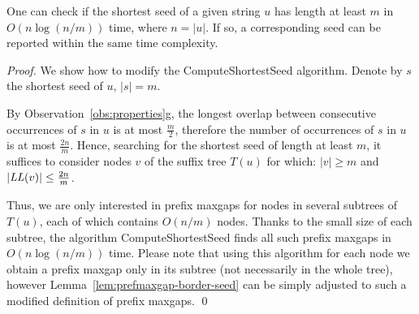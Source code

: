 \documentclass{llncs}
\newcommand{\Tree}{T}
\newcommand{\LL}{\mbox{\textit{LL}}}
\begin{document}
  \begin{theorem}
    One can check if the shortest seed of a given string $u$ has length at least $m$
    in $O(n\log{(n/m)})$ time, where $n=|u|$.
    If so, a corresponding seed can be reported within the same time complexity.
  \end{theorem}
  \begin{proof}
    We show how to modify the ComputeShortestSeed algorithm.
    Denote by $s$ the shortest seed of $u$, $|s|=m$.

    By Observation~\ref{obs:properties}g, the longest overlap between consecutive
    occurrences of $s$ in $u$ is at most $\frac{m}2$, therefore the number of occurrences of
    $s$ in $u$ is at most $\frac{2n}{m}$.
    Hence, searching for the shortest seed of length at least $m$, it suffices to consider
    nodes $v$ of the suffix tree $\Tree(u)$ for which: $|v| \ge m$ and $|\LL(v)| \le \frac{2n}{m}$.
    
    Thus, we are only interested in prefix maxgaps for nodes in several subtrees of
    $\Tree(u)$, each of which contains $O(n/m)$ nodes.
    Thanks to the small size of each subtree, the algorithm ComputeShortestSeed
    finds all such prefix maxgaps in $O(n\log{(n/m)})$ time.
    Please note that using this algorithm for each node we obtain a prefix maxgap
    only in its subtree (not necessarily in the whole tree),
    however Lemma~\ref{lem:prefmaxgap-border-seed} can be simply adjusted to such
    a modified definition of prefix maxgaps.
    \qed
  \end{proof}






  
  
\end{document}
